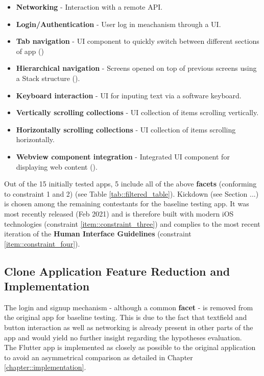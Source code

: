 \begin{itemize}
    \item \textbf{Networking} - Interaction with a remote API.
    \item \textbf{Login/Authentication} - User log in meachanism through a UI.
    \item \textbf{Tab navigation} - UI component to quickly switch between different sections of app (\cite{AppleHIGTabBar2021})
    \item \textbf{Hierarchical navigation} - Screens opened on top of previous screens using a Stack structure (\cite{AppleHIGNavigation2021}).
    \item \textbf{Keyboard interaction} - UI for inputing text via a software keyboard.
    \item \textbf{Vertically scrolling collections} - UI collection of items scrolling vertically.
    \item \textbf{Horizontally scrolling collections} - UI collection of items scrolling horizontally.
    \item \textbf{Webview component integration} - Integrated UI component for displaying web content (\cite{AppleHIGWebViews2021}).
\end{itemize}

Out of the 15 initially tested apps, 5 include all of the above \textbf{facets} (conforming to
constraint 1 and 2) (see Table \ref{tab::filtered_table}). Kickdown (see Section ...) is chosen among the remaining 
contestants for the baseline testing app. It was most recently released (Feb 2021) and is therefore built with modern iOS technologies (constraint \ref{item::constraint_three})
and complies to the most recent iteration of the \textbf{Human Interface Guidelines} (constraint \ref{item::constraint_four}).

\subsection{Clone Application Feature Reduction and Implementation} \label{subsection::clone_app_feature_reduction}
The login and signup mechanism - although a common \textbf{facet} - is removed from the original
app for baseline testing. This is due to the fact that textfield and button interaction as well
as networking is already present in other parts of the app and would yield no further insight
regarding the hypotheses evaluation.\\
The Flutter app is implemented as closely as possible to the original application to avoid an
asymmetrical comparison as detailed in Chapter \ref{chapter::implementation}.

